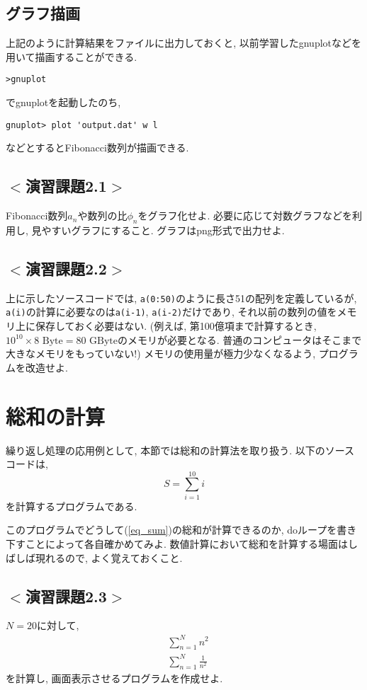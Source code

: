 \subsection*{グラフ描画}
上記のように計算結果をファイルに出力しておくと, 以前学習したgnuplotなどを用いて描画することができる. 
\begin{Verbatim}[frame=single]
>gnuplot
\end{Verbatim}
でgnuplotを起動したのち, 
\begin{Verbatim}[frame=single]
gnuplot> plot 'output.dat' w l
\end{Verbatim}
などとするとFibonacci数列が描画できる. 

\subsection*{$<$演習課題2.1$>$}
Fibonacci数列$a_n$や数列の比$\phi_n$をグラフ化せよ. 
必要に応じて対数グラフなどを利用し, 見やすいグラフにすること. 
グラフはpng形式で出力せよ.  

\subsection*{$<$演習課題2.2$>$}
上に示したソースコードでは, \verb|a(0:50)|のように長さ51の配列を定義しているが, 
\verb|a(i)|の計算に必要なのは\verb|a(i-1)|, \verb|a(i-2)|だけであり, 
それ以前の数列の値をメモリ上に保存しておく必要はない. 
(例えば, 第100億項まで計算するとき, $10^{10} \times 8\mbox{ Byte}=80\mbox{ GByte}$のメモリが必要となる. 
普通のコンピュータはそこまで大きなメモリをもっていない!)
メモリの使用量が極力少なくなるよう, プログラムを改造せよ. 

\section{総和の計算}
繰り返し処理の応用例として, 本節では総和の計算法を取り扱う. 
以下のソースコードは, 
\begin{equation}
S=\sum_{i=1}^{10} i
\label{eq_sum}
\end{equation}
を計算するプログラムである. 


このプログラムでどうして(\ref{eq_sum})の総和が計算できるのか, 
doループを書き下すことによって各自確かめてみよ. 
数値計算において総和を計算する場面はしばしば現れるので, 
よく覚えておくこと. 


\subsection*{$<$演習課題2.3$>$}
$N=20$に対して, 
\begin{align}
&\sum_{n=1}^{N} n^2 \\
&\sum_{n=1}^{N} \frac{1}{n^2}
\end{align}
を計算し, 画面表示させるプログラムを作成せよ. 

